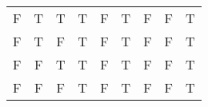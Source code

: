 \documentclass{article}[12pt]
\begin{document}
\begin{enumerate}[(i)]
\begin{table}[H]
\begin{tabular}{c|c|c|||c|c||c||c|||c|||c}
F   & T   & T   & T        & F                     & T         & F                                       & F               & T                                                                      \\
F   & T   & F   & T        & F                     & T         & F                                       & F               & T                                                                      \\
F   & F   & T   & T        & F                     & T         & F                                       & F               & T                                                                      \\
F   & F   & F   & T        & F                     & T         & F                                       & F               & T                                                                     
\end{tabular}
\end{table}
\end{enumerate}









\end{document}
